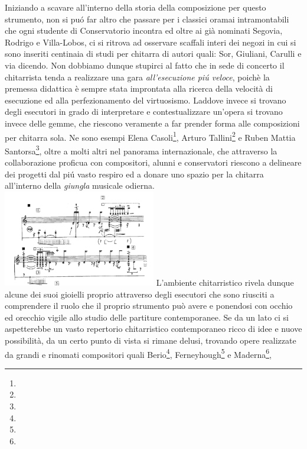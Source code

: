 \documentclass[oneside]{article}
\begin{document}
\begin{multicols*}{2}
Iniziando a scavare all'interno della storia della composizione per questo strumento, non si puó far altro che passare per i classici oramai intramontabili che ogni studente di Conservatorio incontra ed oltre ai già nominati Segovia, Rodrigo e Villa-Lobos, ci si ritrova ad osservare scaffali interi dei negozi in cui si sono inseriti centinaia di studi per chitarra di autori quali: Sor, Giuliani, Carulli e via dicendo. Non dobbiamo dunque stupirci al fatto che in sede di concerto il chitarrista tenda a realizzare una gara \textit{all'esecuzione piú veloce}, poichè la premessa didattica è sempre stata improntata alla ricerca della velocità di esecuzione ed alla perfezionamento del virtuosismo. Laddove invece si trovano degli esecutori in grado di interpretare e contestualizzare un'opera si trovano invece delle gemme, che riescono veramente a far prender forma alle composizioni per chitarra sola. Ne sono esempi Elena Casoli\footnote{}, Arturo Tallini\footnote{} e Ruben Mattia Santorsa\footnote{}, oltre a molti altri nel panorama internazionale, che attraverso la collaborazione proficua con compositori, alunni e conservatori riescono a delineare dei progetti dal piú vasto respiro ed a donare uno spazio per la chitarra all'interno della \textit{giungla} musicale odierna.
\includegraphics[width=0.5\textwidth]{img/ektopos.png}
L'ambiente chitarristico rivela dunque alcune dei suoi gioielli proprio attraverso degli esecutori che sono riusciti a comprendere il ruolo che il proprio strumento può avere e ponendosi con occhio ed orecchio vigile allo studio delle partiture contemporanee. Se da un lato ci si aspetterebbe un vasto repertorio chitarristico contemporaneo ricco di idee e nuove possibilità, da un certo punto di vista si rimane delusi, trovando opere realizzate da grandi e rinomati compositori quali Berio\footnote{}, Ferneyhough\footnote{} e Maderna\footnote{}, 

\end{multicols*}
\end{document}
